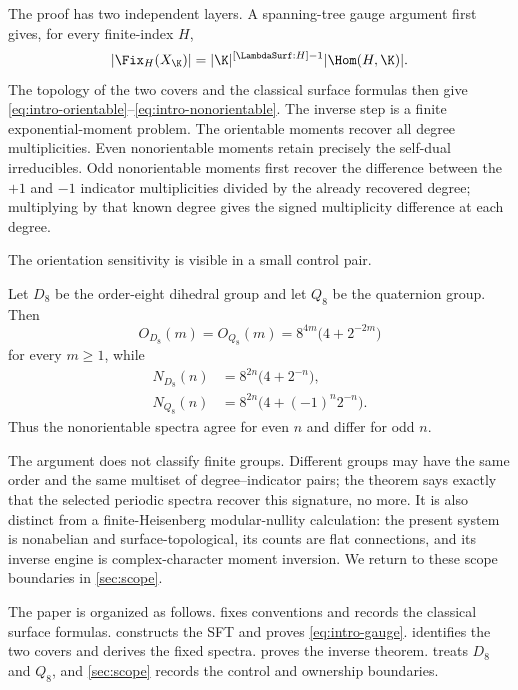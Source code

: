 The proof has two independent layers.  A spanning-tree gauge argument first
gives, for every finite-index $H$,
\begin{equation}
 |\Fix_H(X_{\K})|
 =|\K|^{[\LambdaSurf:H]-1}|\Hom(H,\K)|.
 \label{eq:intro-gauge}
\end{equation}
The topology of the two covers and the classical surface formulas then give
\eqref{eq:intro-orientable}--\eqref{eq:intro-nonorientable}.  The inverse step
is a finite exponential-moment problem.  The orientable moments recover all
degree multiplicities.  Even nonorientable moments retain precisely the
self-dual irreducibles.  Odd nonorientable moments first recover the difference
between the $+1$ and $-1$ indicator multiplicities divided by the already
recovered degree; multiplying by that known degree gives the signed
multiplicity difference at each degree.

The orientation sensitivity is visible in a small control pair.

\begin{corollary}
\label{cor:d8q8-intro}
Let $D_8$ be the order-eight dihedral group and let $Q_8$ be the quaternion
group.  Then
\[
 O_{D_8}(m)=O_{Q_8}(m)
 =8^{4m}\bigl(4+2^{-2m}\bigr)
\]
for every $m\geq1$, while
\[
 \begin{aligned}
 N_{D_8}(n)&=8^{2n}\bigl(4+2^{-n}\bigr),\\
 N_{Q_8}(n)&=8^{2n}\bigl(4+(-1)^n2^{-n}\bigr).
 \end{aligned}
\]
Thus the nonorientable spectra agree for even $n$ and differ for odd $n$.
\end{corollary}

The argument does not classify finite groups.  Different groups may have the
same order and the same multiset of degree--indicator pairs; the theorem says
exactly that the selected periodic spectra recover this signature, no more.
It is also distinct from a finite-Heisenberg modular-nullity calculation: the
present system is nonabelian and surface-topological, its counts are flat
connections, and its inverse engine is complex-character moment inversion.
We return to these scope boundaries in \cref{sec:scope}.

The paper is organized as follows.   fixes conventions
and records the classical surface formulas.   constructs
the SFT and proves \eqref{eq:intro-gauge}.  
identifies the two covers and derives the fixed spectra.
 proves the inverse theorem.
 treats $D_8$ and $Q_8$, and \cref{sec:scope} records the
control and ownership boundaries.
